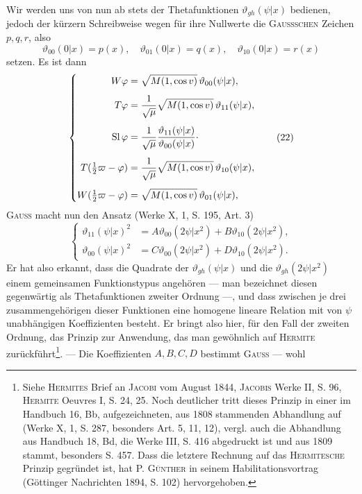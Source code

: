 \par
Wir werden uns von nun ab stets der Thetafunktionen \(\vartheta_{gh}(\psi|x)\) bedienen,
jedoch der kürzern Schreibweise wegen für ihre Nullwerte die \textsc{Gaussschen}
Zeichen \(p,q,r\), also
\[
\vartheta_{00}(0|x)=p(x),\quad \vartheta_{01}(0|x)=q(x),\quad \vartheta_{10}(0|x)=r(x)
\]
\noindent setzen. Es ist dann
\begingroup\makeatletter\tagsleft@true\let\veqno\leqno\makeatother
\begin{equation*}
\left\{\begin{aligned}
W\varphi&=\sqrt{M(1,\cos v)}\,\vartheta_{00}(\psi|x),\\[1ex]
T\varphi&=\frac1{\sqrt\mu}\sqrt{M(1,\cos v)}\,\vartheta_{11}(\psi|x),\\[1ex]
\operatorname{Sl}\varphi&=\frac1{\sqrt\mu}\frac{\vartheta_{11}(\psi|x)}{\vartheta_{00}(\psi|x)}\mathpunct{\vcenter{\hbox{.}}}\\[1ex]
T(\tfrac12\varpi-\varphi)&=\frac1{\sqrt\mu}\sqrt{M(1,\cos v)}\,\vartheta_{10}(\psi|x),\\[1ex]
W(\tfrac12\varpi-\varphi)&=\sqrt{M(1,\cos v)}\,\vartheta_{01}(\psi|x),
\end{aligned}\right.\tag{22}
\end{equation*}
\endgroup
\clearpage{}
\indent \textsc{Gauss} macht nun den Ansatz (Werke X, 1, S. 195, Art. 3)
\begingroup\makeatletter\tagsleft@true\let\veqno\leqno\makeatother
\begin{equation*}
\left\{\begin{aligned}
\vartheta_{11}(\psi|x)^2&=A\vartheta_{00}(2\psi|x^2)+B\vartheta_{10}(2\psi|x^2),\\
\vartheta_{00}(\psi|x)^2&=C\vartheta_{00}(2\psi|x^2)+D\vartheta_{10}(2\psi|x^2).
\end{aligned}\right.\tag{22\,a}
\end{equation*}
\endgroup
\noindent Er hat also erkannt, dass die Quadrate der \(\vartheta_{gh}(\psi|x)\) und die \(\vartheta_{gh}(2\psi|x^2)\) einem
gemeinsamen Funktionstypus angehören — man bezeichnet diesen gegenwärtig
als Thetafunktionen zweiter Ordnung —, und dass zwischen je drei zusammengehörigen dieser Funktionen eine homogene lineare Relation mit von \(\psi\) unabhängigen Koeffizienten besteht. Er bringt also hier, für den Fall der
zweiten Ordnung, das Prinzip zur Anwendung, das man gewöhnlich auf \textsc{Hermite} zurückführt\footnote{Siehe \textsc{Hermites} Brief an \textsc{Jacobi} vom August 1844, \textsc{Jacobis} Werke II, S. 96, \textsc{Hermite} Oeuvres I, S. 24, 25. Noch deutlicher tritt dieses Prinzip in einer im Handbuch 16, Bb, aufgezeichneten, aus 1808 stammenden Abhandlung auf (Werke X, 1, S. 287, besonders Art. 5, 11, 12), vergl. auch die Abhandlung aus Handbuch 18, Bd, die Werke III, S. 416 abgedruckt ist und aus 1809 stammt, besonders S. 457. Dass die letztere Rechnung auf das \textsc{Hermitesche} Prinzip gegründet ist, hat P. \textsc{Günther} in seinem Habilitationsvortrag (Göttinger Nachrichten 1894, S. 102) hervorgehoben.}. — Die Koeffizienten \(A,B,C,D\) bestimmt \textsc{Gauss} — wohl
